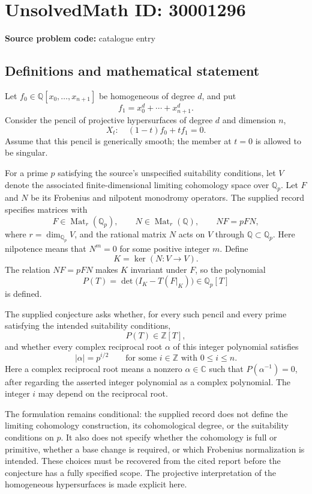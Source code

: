 \documentclass[11pt]{article}
\newcommand{\Z}{\mathbb{Z}}
\newcommand{\Q}{\mathbb{Q}}
\newcommand{\C}{\mathbb{C}}
\begin{document}
\section*{UnsolvedMath ID: 30001296}
\textbf{Source problem code:} catalogue entry
\subsection{Definitions and mathematical statement}
Let \(f_0\in\Q[x_0,\ldots,x_{n+1}]\) be homogeneous of degree \(d\), and put
\[
f_1=x_0^d+\cdots+x_{n+1}^d.
\]
Consider the pencil of projective hypersurfaces of degree \(d\) and dimension \(n\),
\[
X_t:\quad (1-t)f_0+tf_1=0.
\]
Assume that this pencil is generically smooth; the member at \(t=0\) is allowed to be singular.

For a prime \(p\) satisfying the source's unspecified suitability conditions, let \(V\) denote the associated finite-dimensional limiting cohomology space over \(\Q_p\). Let \(F\) and \(N\) be its Frobenius and nilpotent monodromy operators. The supplied record specifies matrices with
\[
F\in\operatorname{Mat}_{r}(\Q_p),\qquad N\in\operatorname{Mat}_{r}(\Q),\qquad NF=pFN,
\]
where \(r=\dim_{\Q_p}V\), and the rational matrix \(N\) acts on \(V\) through \(\Q\subset\Q_p\). Here nilpotence means that \(N^m=0\) for some positive integer \(m\). Define
\[
K=\ker(N:V\longrightarrow V).
\]
The relation \(NF=pFN\) makes \(K\) invariant under \(F\), so the polynomial
\[
P(T)=\det\bigl(I_K-T(F|_K)\bigr)\in\Q_p[T]
\]
is defined.

The supplied conjecture asks whether, for every such pencil and every prime satisfying the intended suitability conditions,
\[
P(T)\in\Z[T],
\]
and whether every complex reciprocal root \(\alpha\) of this integer polynomial satisfies
\[
|\alpha|=p^{i/2}\qquad\text{for some }i\in\Z\text{ with }0\leq i\leq n.
\]
Here a complex reciprocal root means a nonzero \(\alpha\in\C\) such that \(P(\alpha^{-1})=0\), after regarding the asserted integer polynomial as a complex polynomial. The integer \(i\) may depend on the reciprocal root.

The formulation remains conditional: the supplied record does not define the limiting cohomology construction, its cohomological degree, or the suitability conditions on \(p\). It also does not specify whether the cohomology is full or primitive, whether a base change is required, or which Frobenius normalization is intended. These choices must be recovered from the cited report before the conjecture has a fully specified scope. The projective interpretation of the homogeneous hypersurfaces is made explicit here.
\end{document}
